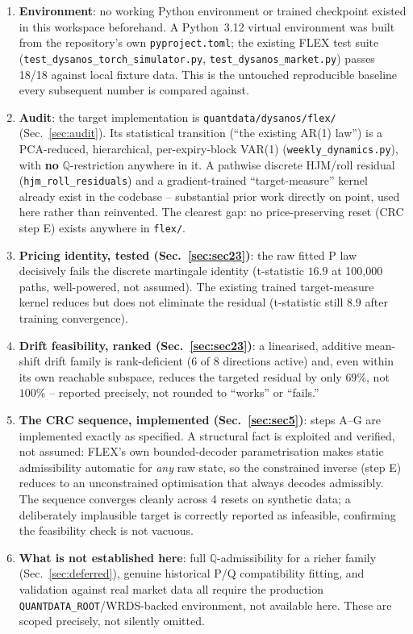 \documentclass[11pt]{article}
\newcommand{\Q}{\mathbb Q}
\begin{document}
\begin{enumerate}
\item \textbf{Environment}: no working Python environment or trained checkpoint
  existed in this workspace beforehand. A Python~3.12 virtual environment was
  built from the repository's own \texttt{pyproject.toml}; the existing FLEX test
  suite (\texttt{test\_dysanos\_torch\_simulator.py}, \texttt{test\_dysanos\_market.py})
  passes 18/18 against local fixture data. This is the untouched reproducible
  baseline every subsequent number is compared against.
\item \textbf{Audit}: the target implementation is \texttt{quantdata/dysanos/flex/}
  (Sec.~\ref{sec:audit}). Its statistical transition (``the existing AR(1) law'')
  is a PCA-reduced, hierarchical, per-expiry-block VAR(1)
  (\texttt{weekly\_dynamics.py}), with \textbf{no} $\Q$-restriction anywhere in it.
  A pathwise discrete HJM/roll residual (\texttt{hjm\_roll\_residuals}) and a
  gradient-trained ``target-measure'' kernel already exist in the codebase --
  substantial prior work directly on point, used here rather than reinvented.
  The clearest gap: no price-preserving reset (CRC step E) exists anywhere in
  \texttt{flex/}.
\item \textbf{Pricing identity, tested (Sec.~\ref{sec:sec23})}: the raw fitted P
  law decisively fails the discrete martingale identity (t-statistic $16.9$ at
  100{,}000 paths, well-powered, not assumed). The existing trained
  target-measure kernel reduces but does not eliminate the residual (t-statistic
  still $8.9$ after training convergence).
\item \textbf{Drift feasibility, ranked (Sec.~\ref{sec:sec23})}: a linearised,
  additive mean-shift drift family is rank-deficient ($6$ of $8$ directions
  active) and, even within its own reachable subspace, reduces the targeted
  residual by only $69\%$, not $100\%$ -- reported precisely, not rounded to
  ``works'' or ``fails.''
\item \textbf{The CRC sequence, implemented (Sec.~\ref{sec:sec5})}: steps A--G are
  implemented exactly as specified. A structural fact is exploited and verified,
  not assumed: FLEX's own bounded-decoder parametrisation makes static
  admissibility automatic for \emph{any} raw state, so the constrained inverse
  (step E) reduces to an unconstrained optimisation that always decodes
  admissibly. The sequence converges cleanly across 4 resets on synthetic data;
  a deliberately implausible target is correctly reported as infeasible,
  confirming the feasibility check is not vacuous.
\item \textbf{What is not established here}: full $\Q$-admissibility for a richer
  family (Sec.~\ref{sec:deferred}), genuine historical P/Q compatibility fitting,
  and validation against real market data all require the production
  \texttt{QUANTDATA\_ROOT}/WRDS-backed environment, not available here. These are
  scoped precisely, not silently omitted.
\end{enumerate}
\end{document}
